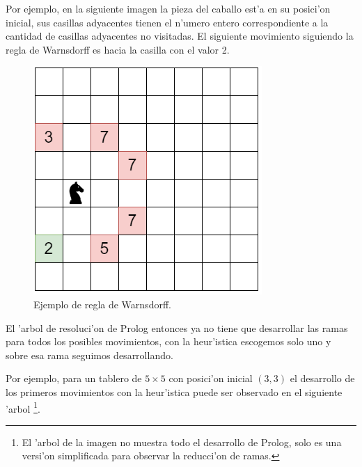 \documentclass[12pt]{article}
\begin{document}
    Por ejemplo, en la siguiente imagen la pieza del caballo est'a en su posici'on inicial, sus casillas adyacentes
    tienen el n'umero entero correspondiente a la cantidad de casillas adyacentes no visitadas. El siguiente movimiento siguiendo la regla
    de Warnsdorff es hacia la casilla con el valor 2.

    \begin{figure}[H]
        \centering
        \includegraphics[scale=0.5]{warnsdorff.png}
        \caption{Ejemplo de regla de Warnsdorff.}
        \label{fig:warnsdorff}
    \end{figure}

    El 'arbol de resoluci'on de Prolog entonces ya no tiene que desarrollar las ramas para todos los posibles movimientos, con la heur'istica escogemos solo uno y sobre
    esa rama seguimos desarrollando.

    Por ejemplo, para un tablero de $5 \times 5$ con posici'on inicial $(3,3)$ el desarrollo de los primeros movimientos con la heur'istica
    puede ser observado en el siguiente 'arbol \footnote{El 'arbol de la imagen no muestra todo el desarrollo de Prolog, solo es una versi'on simplificada
    para observar la reducci'on de ramas.}.
\end{document}
